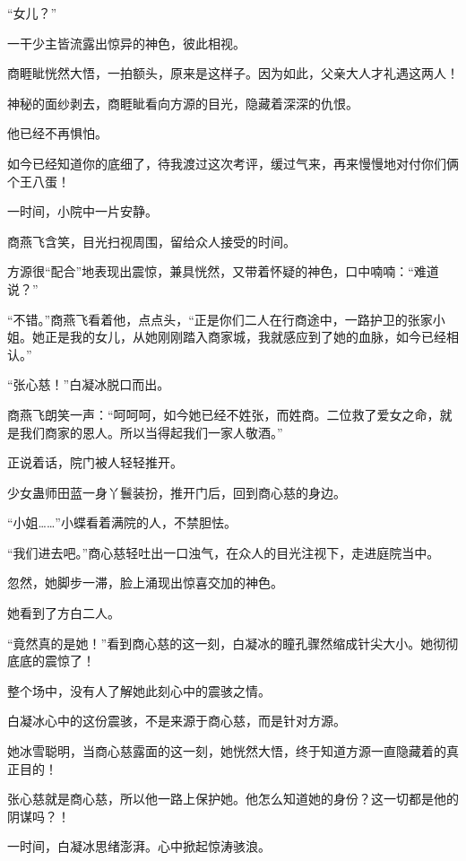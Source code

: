 
\begin{this_body}



“女儿？”

一干少主皆流露出惊异的神色，彼此相视。

商睚眦恍然大悟，一拍额头，原来是这样子。因为如此，父亲大人才礼遇这两人！

神秘的面纱剥去，商睚眦看向方源的目光，隐藏着深深的仇恨。

他已经不再惧怕。

如今已经知道你的底细了，待我渡过这次考评，缓过气来，再来慢慢地对付你们俩个王八蛋！

一时间，小院中一片安静。

商燕飞含笑，目光扫视周围，留给众人接受的时间。

方源很“配合”地表现出震惊，兼具恍然，又带着怀疑的神色，口中喃喃：“难道说？”

“不错。”商燕飞看着他，点点头，“正是你们二人在行商途中，一路护卫的张家小姐。她正是我的女儿，从她刚刚踏入商家城，我就感应到了她的血脉，如今已经相认。”

“张心慈！”白凝冰脱口而出。

商燕飞朗笑一声：“呵呵呵，如今她已经不姓张，而姓商。二位救了爱女之命，就是我们商家的恩人。所以当得起我们一家人敬酒。”

正说着话，院门被人轻轻推开。

少女蛊师田蓝一身丫鬟装扮，推开门后，回到商心慈的身边。

“小姐……”小蝶看着满院的人，不禁胆怯。

“我们进去吧。”商心慈轻吐出一口浊气，在众人的目光注视下，走进庭院当中。

忽然，她脚步一滞，脸上涌现出惊喜交加的神色。

她看到了方白二人。

“竟然真的是她！”看到商心慈的这一刻，白凝冰的瞳孔骤然缩成针尖大小。她彻彻底底的震惊了！

整个场中，没有人了解她此刻心中的震骇之情。

白凝冰心中的这份震骇，不是来源于商心慈，而是针对方源。

她冰雪聪明，当商心慈露面的这一刻，她恍然大悟，终于知道方源一直隐藏着的真正目的！

张心慈就是商心慈，所以他一路上保护她。他怎么知道她的身份？这一切都是他的阴谋吗？！

一时间，白凝冰思绪澎湃。心中掀起惊涛骇浪。


\end{this_body}
